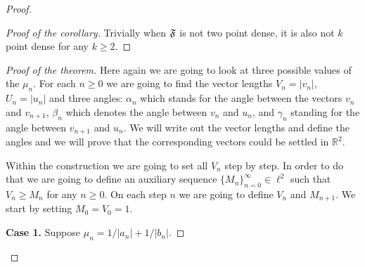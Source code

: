 \begin{proof}
\begin{proof}[Proof of the corollary]
        Trivially when $\mathfrak{F}$ is not two point dense, it is also not $k$ point dense for any $k \geq 2$.
      \end{proof}
      \begin{proof}[Proof of the theorem]
        Here again we are going to look at three possible values of the $\mu_n$.
        For each $n \geq 0$ we are going to find the vector lengths $V_n = |v_n|$, $U_n = |u_n|$ and three angles:
          $\alpha_n$ which stands for the angle between the vectors $v_n$ and $v_{n + 1}$,
          $\beta_n$ which denotes the angle between $v_n$ and $u_n$,
          and $\gamma_n$ standing for the angle between $v_{n + 1}$ and $u_n$.
        We will write out the vector lengths and define the angles and we will prove that the corresponding vectors could be settled in $\mathbb{R}^2$.

        Within the construction we are going to set all $V_n$ step by step.
        In order to do that we are going to define an auxiliary sequence $\{M_n\}_{n=0}^\infty \in \ell^2$ such that $V_n \geq M_n$ for any $n \geq 0$.
        On each step $n$ we are going to define $V_n$ and $M_{n+1}$.
        We start by setting $M_0 = V_0 = 1$.

        \noindent\textbf{Case 1.} Suppose $\mu_n = 1/|a_n| + 1/|b_n|$.


\end{proof}
\end{proof}
